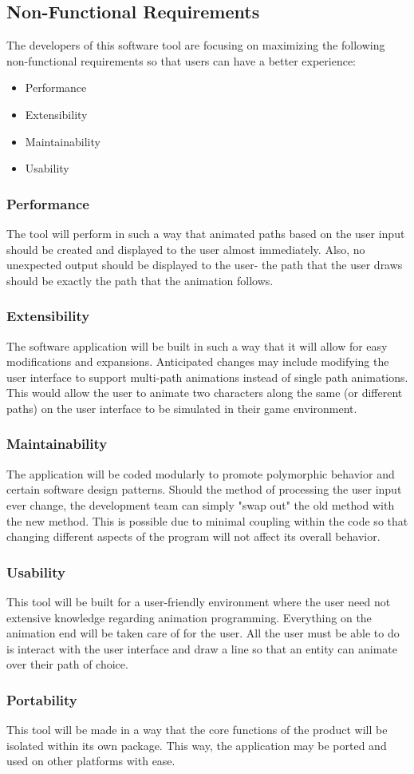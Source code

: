 \subsection{Non-Functional Requirements}
The developers of this software tool are focusing on maximizing the following non-functional requirements so that users can have a better experience:

\begin{itemize}
 \item Performance
 \item Extensibility
 \item Maintainability
 \item Usability
\end{itemize}

\subsubsection{Performance}
The tool will perform in such a way that animated paths based on the user input should be created and displayed to the user almost immediately. Also, no unexpected output should be displayed to the user- the path that the user draws should be exactly the path that the animation follows.

\subsubsection{Extensibility}
The software application will be built in such a way that it will allow for easy modifications and expansions. Anticipated changes may include modifying the user interface to support multi-path animations instead of single path animations. This would allow the user to animate two characters along the same (or different paths) on the user interface to be simulated in their game environment.

\subsubsection{Maintainability}
The application will be coded modularly to promote polymorphic behavior and certain software design patterns. Should the method of processing the user input ever change, the development team can simply "swap out" the old method with the new method. This is possible due to minimal coupling within the code so that changing different aspects of the program will not affect its overall behavior.

\subsubsection{Usability}
This tool will be built for a user-friendly environment where the user need not extensive knowledge regarding animation programming. Everything on the animation end will be taken care of for the user. All the user must be able to do is interact with the user interface and draw a line so that an entity can animate over their path of choice.

\subsubsection{Portability}
This tool will be made in a way that the core functions of the product will be isolated within its own package. This way, the application may be ported and used on other platforms with ease.
